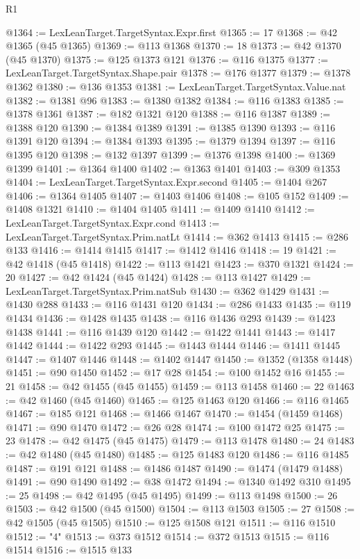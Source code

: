 \begin{lexlean}{R1}
\begin{coremodule}
@1364 := LexLeanTarget.TargetSyntax.Expr.first
@1365 := 17
@1368 := @42 @1365 (@45 @1365)
@1369 := @113 @1368
@1370 := 18
@1373 := @42 @1370 (@45 @1370)
@1375 := @125 @1373 @121
@1376 := @116 @1375
@1377 := LexLeanTarget.TargetSyntax.Shape.pair
@1378 := @176 @1377
@1379 := @1378 @1362
@1380 := @136 @1353
@1381 := LexLeanTarget.TargetSyntax.Value.nat
@1382 := @1381 @96
@1383 := @1380 @1382
@1384 := @116 @1383
@1385 := @1378 @1361
@1387 := @182 @1321 @120
@1388 := @116 @1387
@1389 := @1388 @120
@1390 := @1384 @1389
@1391 := @1385 @1390
@1393 := @116 @1391 @120
@1394 := @1384 @1393
@1395 := @1379 @1394
@1397 := @116 @1395 @120
@1398 := @132 @1397
@1399 := @1376 @1398
@1400 := @1369 @1399
@1401 := @1364 @1400
@1402 := @1363 @1401
@1403 := @309 @1353
@1404 := LexLeanTarget.TargetSyntax.Expr.second
@1405 := @1404 @267
@1406 := @1364 @1405
@1407 := @1403 @1406
@1408 := @105 @152
@1409 := @1408 @1321
@1410 := @1404 @1405
@1411 := @1409 @1410
@1412 := LexLeanTarget.TargetSyntax.Expr.cond
@1413 := LexLeanTarget.TargetSyntax.Prim.natLt
@1414 := @362 @1413
@1415 := @286 @133
@1416 := @1414 @1415
@1417 := @1412 @1416
@1418 := 19
@1421 := @42 @1418 (@45 @1418)
@1422 := @113 @1421
@1423 := @370 @1321
@1424 := 20
@1427 := @42 @1424 (@45 @1424)
@1428 := @113 @1427
@1429 := LexLeanTarget.TargetSyntax.Prim.natSub
@1430 := @362 @1429
@1431 := @1430 @288
@1433 := @116 @1431 @120
@1434 := @286 @1433
@1435 := @119 @1434
@1436 := @1428 @1435
@1438 := @116 @1436 @293
@1439 := @1423 @1438
@1441 := @116 @1439 @120
@1442 := @1422 @1441
@1443 := @1417 @1442
@1444 := @1422 @293
@1445 := @1443 @1444
@1446 := @1411 @1445
@1447 := @1407 @1446
@1448 := @1402 @1447
@1450 := @1352 (@1358 @1448)
@1451 := @90 @1450
@1452 := @17 @28
@1454 := @100 @1452 @16
@1455 := 21
@1458 := @42 @1455 (@45 @1455)
@1459 := @113 @1458
@1460 := 22
@1463 := @42 @1460 (@45 @1460)
@1465 := @125 @1463 @120
@1466 := @116 @1465
@1467 := @185 @121
@1468 := @1466 @1467
@1470 := @1454 (@1459 @1468)
@1471 := @90 @1470
@1472 := @26 @28
@1474 := @100 @1472 @25
@1475 := 23
@1478 := @42 @1475 (@45 @1475)
@1479 := @113 @1478
@1480 := 24
@1483 := @42 @1480 (@45 @1480)
@1485 := @125 @1483 @120
@1486 := @116 @1485
@1487 := @191 @121
@1488 := @1486 @1487
@1490 := @1474 (@1479 @1488)
@1491 := @90 @1490
@1492 := @38 @1472
@1494 := @1340 @1492 @310
@1495 := 25
@1498 := @42 @1495 (@45 @1495)
@1499 := @113 @1498
@1500 := 26
@1503 := @42 @1500 (@45 @1500)
@1504 := @113 @1503
@1505 := 27
@1508 := @42 @1505 (@45 @1505)
@1510 := @125 @1508 @121
@1511 := @116 @1510
@1512 := "4"
@1513 := @373 @1512
@1514 := @372 @1513
@1515 := @116 @1514
@1516 := @1515 @133

\end{coremodule}
\end{lexlean}
